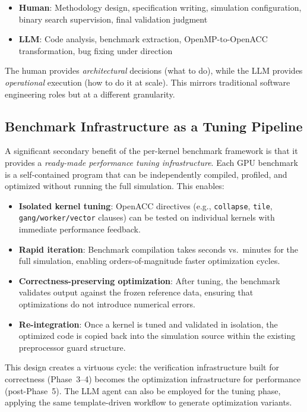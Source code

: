 \documentclass[conference]{IEEEtran}
\begin{document}
\begin{itemize}
\item \textbf{Human}: Methodology design, specification writing, simulation
  configuration, binary search supervision, final validation judgment
\item \textbf{LLM}: Code analysis, benchmark extraction, OpenMP-to-OpenACC
  transformation, bug fixing under direction
\end{itemize}

The human provides \emph{architectural} decisions (what to do), while the
LLM provides \emph{operational} execution (how to do it at scale). This
mirrors traditional software engineering roles but at a different
granularity.

\subsection{Benchmark Infrastructure as a Tuning Pipeline}

A significant secondary benefit of the per-kernel benchmark framework is
that it provides a \emph{ready-made performance tuning infrastructure}. Each
GPU benchmark is a self-contained program that can be independently compiled,
profiled, and optimized without running the full simulation. This enables:

\begin{itemize}
\item \textbf{Isolated kernel tuning}: OpenACC directives (e.g.,
  \texttt{collapse}, \texttt{tile}, \texttt{gang/worker/vector} clauses)
  can be tested on individual kernels with immediate performance feedback.
\item \textbf{Rapid iteration}: Benchmark compilation takes seconds vs.\
  minutes for the full simulation, enabling orders-of-magnitude faster
  optimization cycles.
\item \textbf{Correctness-preserving optimization}: After tuning, the
  benchmark validates output against the frozen reference data, ensuring
  that optimizations do not introduce numerical errors.
\item \textbf{Re-integration}: Once a kernel is tuned and validated in
  isolation, the optimized code is copied back into the simulation source
  within the existing preprocessor guard structure.
\end{itemize}

This design creates a virtuous cycle: the verification infrastructure built
for correctness (Phase~3--4) becomes the optimization infrastructure for
performance (post-Phase~5). The LLM agent can also be employed for the
tuning phase, applying the same template-driven workflow to generate
optimization variants.
\end{document}

